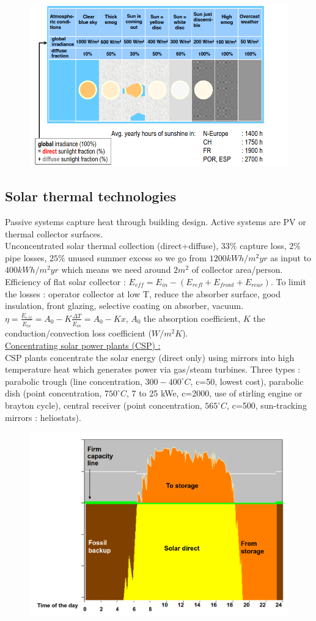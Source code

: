 \documentclass[../main.tex]{subfiles}
\begin{document}
\begin{figure}[hbt!]
    \centering
    \includegraphics[width=0.5\linewidth]{IMAGES/Renewable/Screenshot from 2025-03-18 22-35-38.png}
\end{figure}

\subsection{Solar thermal technologies}
Passive systems capture heat through building design. Active systems are PV or thermal collector surfaces. \\
Unconcentrated solar thermal collection (direct+diffuse), $33\%$ capture loss, $2\%$ pipe losses, $25\%$ unused summer excess so we go from $1200kWh/m^2 yr$ as input to $400kWh/m^2yr$ which means we need around $2m^2$ of collector area/person. \\
Efficiency of flat solar collector : $E_{eff} = E_{in}-(E_{refl} + E_{front} + E_{rear})$. To limit the losses : operator collector at low T, reduce the absorber surface, good insulation, front glazing, selective coating on absorber, vacuum. $\eta = \frac{\dot{E}_{eff}}{\dot{E}_{in}} = A_0 - K \frac{\Delta T}{\dot{E}_{in}} = A_0 - Kx$, $A_0$ the absorption coefficient, $K$ the conduction/convection loss coefficient ($W/m^2K$).\\

\quad \underline{Concentrating solar power plants (CSP) :}\\
CSP plants concentrate the solar energy (direct only) using mirrors into high temperature heat which generates power via gas/steam turbines. Three types : parabolic trough (line concentration, $300-400^\circ C$, c=50, lowest cost), parabolic dish (point concentration, $750^\circ C$, 7 to 25 kWe, c=2000, use of stirling engine or brayton cycle), central receiver (point concentration, $565^\circ C$, c=500, sun-tracking mirrors : heliostats).\\

\begin{figure}[hbt!]
    \centering
    \includegraphics[width=0.5\linewidth]{IMAGES/Renewable/Screenshot from 2025-03-25 22-50-58.png}
\end{figure}
\end{document}

